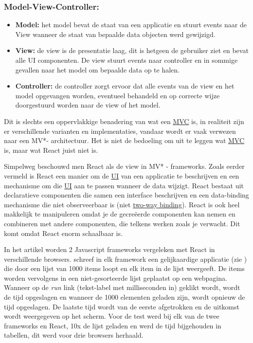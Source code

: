 	\subsubsection*{Model-View-Controller:}
	\begin{itemize}
		\item \textbf{Model:} het model bevat de staat van een applicatie en stuurt events naar de View wanneer de staat van bepaalde data objecten werd gewijzigd.
		\item \textbf{View:} de view is de presentatie laag, dit is hetgeen de gebruiker ziet en bevat alle UI componenten. De view stuurt events naar controller en in sommige gevallen naar het model om bepaalde data op te halen.
		\item \textbf{Controller:} de controller zorgt ervoor dat alle events van de view en het model opgevangen worden, eventueel behandeld en op correcte wijze doorgestuurd worden naar de view of het model.
	\end{itemize}
	
	Dit is slechts een oppervlakkige benadering van wat een \hyperref[mvc]{MVC} is, in realiteit zijn er verschillende varianten en implementaties, vandaar wordt er vaak verwezen naar een MV*- architectuur. Het is niet de bedoeling om uit te leggen wat \hyperref[mvc]{MVC} is, maar wat React juist niet is.
	
	Simpelweg beschouwd men React als de view in MV* - frameworks. Zoals eerder vermeld is React een manier om de \hyperref[ui]{UI} van een applicatie te beschrijven en een mechanisme om die \hyperref[ui]{UI} aan te passen wanneer de data wijzigt. React bestaat uit declaratieve componenten die samen een interface beschrijven en een data-binding mechanisme die niet observeerbaar is (niet \hyperref[twdb]{two-way binding}). React is ook heel makkelijk te manipuleren omdat je de gecreëerde componenten kan nemen en combineren met andere componenten, die telkens werken zoals je verwacht. Dit komt omdat React enorm schaalbaar is.
	
	In het artikel \cite{Harrington:React} worden 2 Javascript frameworks vergeleken met React in verschillende browsers. \citeauthor{Harrington:React} schreef in elk framework een gelijkaardige applicatie (zie ) die door een lijst van 1000 items loopt en elk item in de lijst weergeeft. De items worden vervolgens in een niet-gesorteerde lijst geplaatst op een webpagina. Wanneer op de \emph{run} link (tekst-label met milliseconden in) geklikt wordt, wordt de tijd opgeslagen en wanneer de 1000 elementen geladen zijn, wordt opnieuw de tijd opgeslagen. De laatste tijd wordt van de eerste afgetrokken en de uitkomst wordt weergegeven op het scherm. Voor de test werd bij elk van de twee frameworks en React, 10x de lijst geladen en werd de tijd bijgehouden in tabellen, dit werd voor drie browsers herhaald.
	
